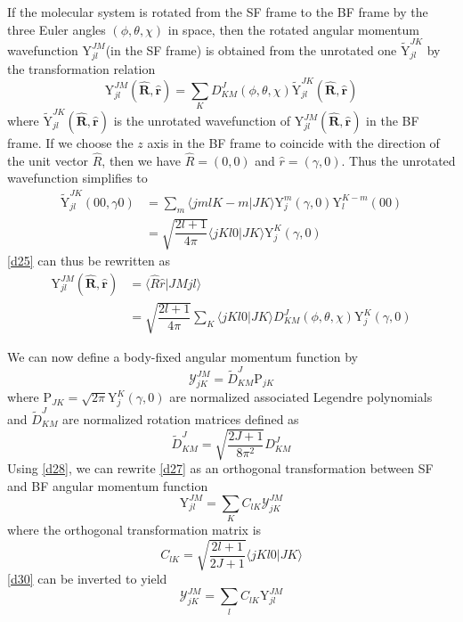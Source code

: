 \documentclass[]{article}
\begin{document}
If the molecular system is rotated from the SF frame to the BF frame by the three Euler angles $(\phi,\theta,\chi)$ in space, then the rotated angular momentum wavefunction $\mathrm{Y}^{JM}_{jl}$(in the SF frame) is obtained from the unrotated one $\widetilde{\mathrm{Y}}^{JK}_{jl}$ by the transformation relation
\begin{equation}
	\mathrm{Y}^{JM}_{jl}(\mathbf{\hat{R}},\mathbf{\hat{r}})=\sum\limits_KD^J_{KM}(\phi,\theta,\chi)\widetilde{\mathrm{Y}}^{JK}_{jl}(\mathbf{\hat{R}},\mathbf{\hat{r}})
	\label{d25}
\end{equation}
where $\widetilde{\mathrm{Y}}^{JK}_{jl}(\mathbf{\hat{R}},\mathbf{\hat{r}})$ is the unrotated wavefunction of $\mathrm{Y}^{JM}_{jl}(\mathbf{\hat{R}},\mathbf{\hat{r}})$ in the BF frame. If we choose the $z$ axis in the BF frame to coincide with the direction of the unit vector $\hat{R}$, then we have $\hat{R}=(0,0)$ and $\hat{r}=(\gamma,0)$. Thus the unrotated wavefunction simplifies to
\begin{align}
	\widetilde{\mathrm{Y}}^{JK}_{jl}(00,\gamma0)&=\sum\limits_m\langle jmlK-m|JK\rangle\mathrm{Y}^m_j(\gamma,0)\mathrm{Y}^{K-m}_l(00)\nonumber\\
	&=\sqrt{\dfrac{2l+1}{4\pi}}\langle jKl0|JK\rangle \mathrm{Y}^K_j(\gamma,0)
\end{align}
\eqref{d25} can thus be rewritten as
\begin{align}
	\mathrm{Y}^{JM}_{jl}(\mathbf{\hat{R}},\mathbf{\hat{r}})&=\langle\hat{R}\hat{r}|JMjl\rangle\nonumber\\
	&=\sqrt{\dfrac{2l+1}{4\pi}}\sum\limits_K\langle jKl0|JK\rangle D^J_{KM}(\phi,\theta,\chi)\mathrm{Y}^K_j(\gamma,0)
	\label{d27}
\end{align}

We can now define a body-fixed angular momentum function by
\begin{equation}
	\mathcal{Y}^{JM}_{jK}=\widetilde{D}^J_{KM}\mathrm{P}_{jK}
	\label{d28}
\end{equation}
where $\mathrm{P}_{JK}=\sqrt{2\pi}\mathrm{Y}^{K}_j(\gamma,0)$ are normalized associated Legendre polynomials and $\widetilde{D}^J_{KM}$ are normalized rotation matrices defined as
\begin{equation}
	\widetilde{D}^J_{KM}=\sqrt{\dfrac{2J+1}{8\pi^2}}D^J_{KM}
\end{equation}
Using \eqref{d28}, we can rewrite \eqref{d27} as an orthogonal transformation between SF and BF angular momentum function
\begin{equation}
	\mathrm{Y}^{JM}_{jl}=\sum\limits_KC_{lK}\mathcal{Y}^{JM}_{jK}
	\label{d30}
\end{equation} 
where the orthogonal transformation matrix is
\begin{equation}
	C_{lK}=\sqrt{\dfrac{2l+1}{2J+1}}\langle jKl0|JK\rangle
\end{equation}
\eqref{d30} can be inverted to yield
\begin{equation}
	\mathcal{Y}^{JM}_{jK}=\sum\limits_lC_{lK}\mathrm{Y}^{JM}_{jl}
\end{equation}
\end{document}
